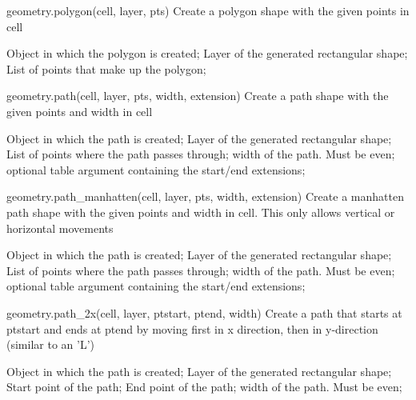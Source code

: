 \begin{APIfunc}{geometry.polygon(cell, layer, pts)}
    Create a polygon shape with the given points in cell
    \begin{APIparameters}
            Object in which the polygon is created;
            Layer of the generated rectangular shape;
            List of points that make up the polygon;
    \end{APIparameters}
\end{APIfunc}
\begin{APIfunc}{geometry.path(cell, layer, pts, width, extension)}
    Create a path shape with the given points and width in cell
    \begin{APIparameters}
            Object in which the path is created;
            Layer of the generated rectangular shape;
            List of points where the path passes through;
            width of the path. Must be even;
            optional table argument containing the start/end extensions;
    \end{APIparameters}
\end{APIfunc}
\begin{APIfunc}{geometry.path\_manhatten(cell, layer, pts, width, extension)}
    Create a manhatten path shape with the given points and width in cell. This only allows vertical or horizontal movements
    \begin{APIparameters}
            Object in which the path is created;
            Layer of the generated rectangular shape;
            List of points where the path passes through;
            width of the path. Must be even;
            optional table argument containing the start/end extensions;
    \end{APIparameters}
\end{APIfunc}
\begin{APIfunc}{geometry.path\_2x(cell, layer, ptstart, ptend, width)}
    Create a path that starts at ptstart and ends at ptend by moving first in x direction, then in y-direction (similar to an 'L')
    \begin{APIparameters}
            Object in which the path is created;
            Layer of the generated rectangular shape;
            Start point of the path;
            End point of the path;
            width of the path. Must be even;
    \end{APIparameters}
\end{APIfunc}
